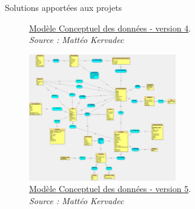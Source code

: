 \documentclass{beamer}
\begin{document}
\begin{frame}[label=realisation]{Solutions apportées aux projets}
\begin{center}
{\begin{figure}[t]
				\caption{	
					\centering			
  					\href{https://github.com/Matteo-K/Soutenance_E-delic/blob/main/img/conception/mcd_V4.jpg}{\underline{Modèle Conceptuel des données - version 4}}.\\
  					\textit{Source : Mattéo Kervadec}
				}
  				\label{fig:mcdV4}
  			\end{figure}
		}
		 {
			\addtocounter{figure}{4}
			\begin{figure}[t]
  				\includegraphics[height=5.5cm]{../img/conception/mcd_V5.jpg}
				\caption{	
					\centering			
  					\href{https://github.com/Matteo-K/Soutenance_E-delic/blob/main/img/conception/mcd_V5.jpg}{\underline{Modèle Conceptuel des données - version 5}}.\\
  					\textit{Source : Mattéo Kervadec}
				}
  				\label{fig:mcdV5}
  			\end{figure}
		}
	\end{center}
	\vfill
	\addtocounter{figure}{4}
\end{frame}
\end{document}
